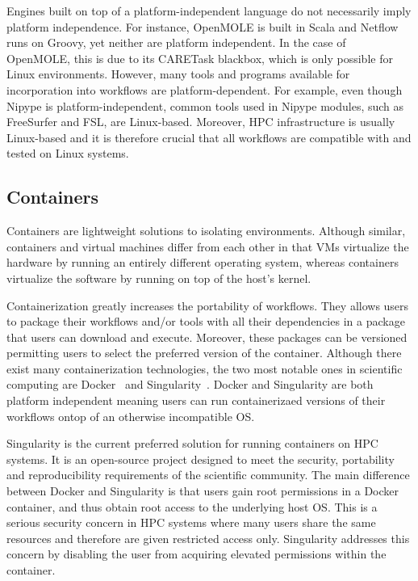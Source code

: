            Engines built on top of a platform-independent language do not
            necessarily imply platform independence. For instance, OpenMOLE is
            built in Scala and Netflow runs on Groovy, yet neither are platform
            independent. In the case of OpenMOLE, this is due to its CARETask
            blackbox, which is only possible for Linux environments. However,
            many tools and programs available for incorporation into workflows
            are platform-dependent. For example, even though Nipype is
            platform-independent, common tools used in Nipype modules, such as
            FreeSurfer and FSL, are Linux-based. Moreover, HPC infrastructure is
            usually Linux-based and it is therefore crucial that all workflows
            are compatible with and tested on Linux systems.
             
       \subsection{Containers}

            Containers are lightweight solutions to isolating environments.
            Although similar, containers and virtual machines differ from each
            other in that VMs virtualize the hardware by running an entirely
            different operating system, whereas containers virtualize the
            software by running on top of the host's kernel. 
        
            Containerization greatly increases the portability of workflows.
            They allows users to package their workflows and/or tools with all
            their dependencies in a package that users can download and execute.
            Moreover, these packages can be versioned permitting users to select
            the preferred version of the container. Although there exist many
            containerization technologies, the two most notable ones in
            scientific computing are Docker~\cite{merkel2014docker} and
            Singularity~\cite{10.1371/journal.pone.0177459}. Docker and
            Singularity are both platform independent meaning users can run
            containerizaed versions of their workflows ontop of an otherwise
            incompatible OS.

            Singularity is the current preferred solution for running containers
            on HPC systems. It is an open-source project designed to meet the
            security, portability and reproducibility requirements of the
            scientific community. The main difference between Docker and
            Singularity is that users gain root permissions in a Docker
            container, and thus obtain root access to the underlying host OS.
            This is a serious security concern in HPC systems where many users
            share the same resources and therefore are given restricted access
            only. Singularity addresses this concern by disabling the user from
            acquiring elevated permissions within the container. 

